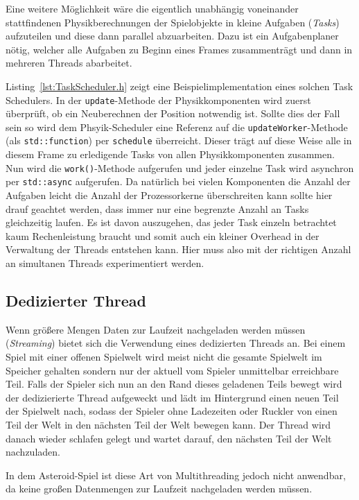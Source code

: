 \documentclass[12pt, a4paper, titlepage, hidelinks]{scrreprt}
\begin{document}
Eine weitere Möglichkeit wäre die eigentlich unabhängig voneinander stattfindenen Physikberechnungen der Spielobjekte in kleine Aufgaben (\textit{Tasks}) aufzuteilen und diese dann parallel abzuarbeiten. Dazu ist ein Aufgabenplaner  nötig, welcher alle Aufgaben zu Beginn eines Frames zusammenträgt und dann in mehreren Threads abarbeitet.

Listing~\autoref{lst:TaskScheduler.h} zeigt eine Beispielimplementation eines solchen Task Schedulers. In der \texttt{update}-Methode der Physikkomponenten wird zuerst überprüft, ob ein Neuberechnen der Position notwendig ist. Sollte dies der Fall sein so wird dem Phsyik-Scheduler eine Referenz auf die \texttt{updateWorker}-Methode (als \texttt{std::function}) per \texttt{schedule} überreicht. Dieser trägt auf diese Weise alle in diesem Frame zu erledigende Tasks von allen Physikkomponenten zusammen. Nun wird die \texttt{work()}-Methode aufgerufen und jeder einzelne Task wird asynchron per \texttt{std::async} aufgerufen. Da natürlich bei vielen Komponenten die Anzahl der Aufgaben leicht die Anzahl der Prozessorkerne überschreiten kann sollte hier drauf geachtet werden, dass immer nur eine begrenzte Anzahl an Tasks gleichzeitig laufen. Es ist davon auszugehen, das jeder Task einzeln betrachtet kaum Rechenleistung braucht und somit auch ein kleiner Overhead in der Verwaltung der Threads entstehen kann. Hier muss also mit der richtigen Anzahl an simultanen Threads experimentiert werden.


\subsection{Dedizierter Thread}
Wenn größere Mengen Daten zur Laufzeit nachgeladen werden müssen (\textit{Streaming}) bietet sich die Verwendung eines dedizierten Threads an. Bei einem Spiel mit einer offenen Spielwelt wird meist nicht die gesamte Spielwelt im Speicher gehalten sondern nur der aktuell vom Spieler unmittelbar erreichbare Teil. Falls der Spieler sich nun an den Rand dieses geladenen Teils bewegt wird der dedizierierte Thread aufgeweckt und lädt im Hintergrund einen neuen Teil der Spielwelt nach, sodass der Spieler ohne Ladezeiten oder Ruckler von einen Teil der Welt in den nächsten Teil der Welt bewegen kann. Der Thread wird danach wieder schlafen gelegt und wartet darauf, den nächsten Teil der Welt nachzuladen.

In dem Asteroid-Spiel ist diese Art von Multithreading jedoch nicht anwendbar, da keine großen Datenmengen zur Laufzeit nachgeladen werden müssen.
\end{document}
